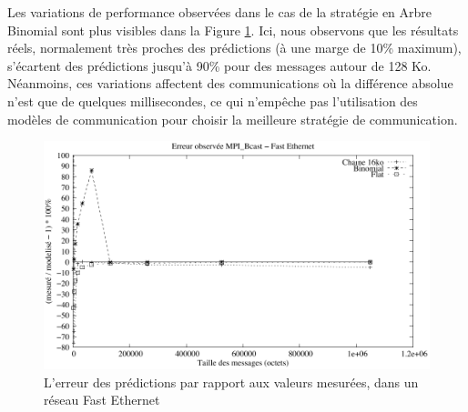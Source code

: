 %
%
%	
%	


Les variations de performance observées dans le cas de la stratégie
en Arbre Binomial sont plus visibles dans la Figure \ref{Figure:Erreur-Bcast-FEth}.
Ici, nous observons que les résultats réels, normalement très proches
des prédictions (à une marge de 10\% maximum), s'écartent des prédictions
jusqu'à 90\% pour des messages autour de 128 Ko. Néanmoins, ces variations
affectent des communications où la différence absolue n'est que de
quelques millisecondes, ce qui n'empêche pas l'utilisation des modèles
de communication pour choisir la meilleure stratégie de communication. 

%
\begin{figure}[h]
	\centering
			\includegraphics[width=0.6\linewidth]{images/modeles/FEth/Bcast/error}
		
	
	\caption{\label{Figure:Erreur-Bcast-FEth}L'erreur des prédictions par rapport
		aux valeurs mesurées, dans un réseau Fast Ethernet}
	
\end{figure}



